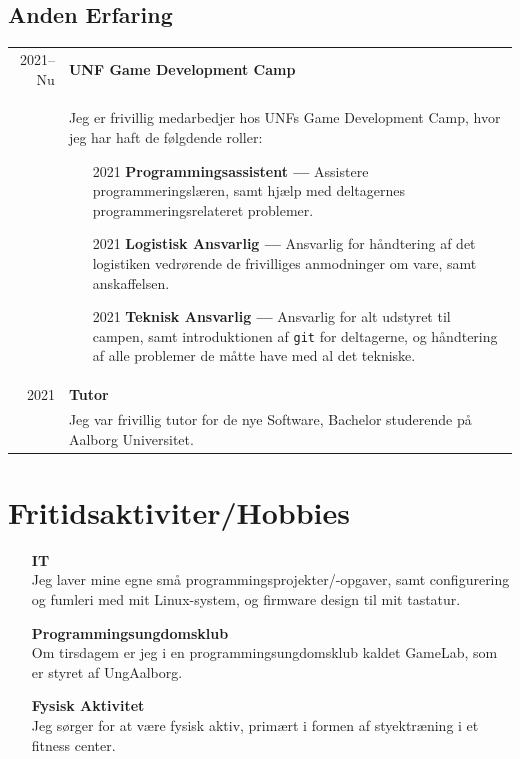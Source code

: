 \documentclass{article}
\begin{document}
    \subsection*{Anden Erfaring}
    \begin{tabular}{r|p{.82\linewidth}}
        2021--Nu & \textbf{UNF Game Development Camp}\\
    &   Jeg er frivillig medarbedjer hos UNFs Game Development Camp, hvor jeg har haft de følgdende roller:
        \begin{itemize}\setlength\itemsep{0em}
            \item[2021] \textbf{Programmingsassistent ---} Assistere programmeringslæren, samt hjælp
                med deltagernes programmeringsrelateret problemer.
            \item[2021] \textbf{Logistisk Ansvarlig ---} Ansvarlig for håndtering af det logistiken
                vedrørende de frivilliges anmodninger om vare, samt anskaffelsen.
            \item[2021] \textbf{Teknisk Ansvarlig ---} Ansvarlig for alt udstyret til campen, samt
                introduktionen af \verb|git| for deltagerne, og håndtering af alle problemer de
                måtte have med al det tekniske.
        \end{itemize}
        \\
        2021 & \textbf{Tutor}\\
    &   Jeg var frivillig tutor for de nye Software, Bachelor studerende på Aalborg Universitet.
    \end{tabular}

    \section*{Fritidsaktiviter/Hobbies}
    \begin{itemize}\setlength\itemsep{0.5em}
        \item[] \textbf{IT}\\
            Jeg laver mine egne små programmingsprojekter/-opgaver, samt configurering og fumleri
            med mit Linux-system, og firmware design til mit tastatur.
        \item[] \textbf{Programmingsungdomsklub}\\
            Om tirsdagem er jeg i en programmingsungdomsklub kaldet GameLab, som er styret af
            UngAalborg.
        \item[] \textbf{Fysisk Aktivitet}\\
            Jeg sørger for at være fysisk aktiv, primært i formen af styektræning i et fitness center.
    \end{itemize}
\end{document}
